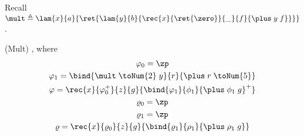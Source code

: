 Recall $\mult \triangleq \lam{x}{a}{\ret{\lam{y}{b}{\rec{x}{\ret{\zero}}{\_}{f}{\plus\; y\; f}}}}
$. 
\begin{lemma}(Mult)\label{lemma:mult}
,
where 
\begin{gather*}
    \varphi_0 = \zp\\
    \varphi_1 = \bind{\mult\;\toNum{2}\;y}{r}{\plus\;r\;\toNum{5}}\\
    \varphi= \rec{x}{\varphi_0^+}{z}{g}{\bind{\varphi_1}{\phi_1}{\plus\;\phi_1\;g}^+}\\
    \varrho_0 = \zp\\
    \varrho_1 = \zp\\
    \varrho= \rec{x}{\varrho_0}{z}{g}{\bind{\varrho_1}{\rho_1}{\plus\;\rho_1\;g}}\\
\end{gather*}
\end{lemma}

